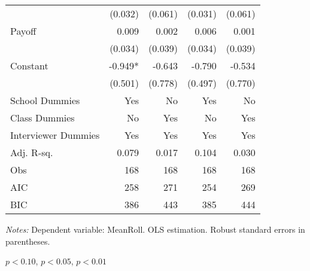 \begin{table}[htbp]
\begin{threeparttable}
\begin{tabular}{l*{4}{D{.}{.}{-1}}}
                    &             (0.032)   &             (0.061)   &             (0.031)   &             (0.061)   \\
Payoff              &               0.009   &               0.002   &               0.006   &               0.001   \\
                    &             (0.034)   &             (0.039)   &             (0.034)   &             (0.039)   \\
Constant            &              -0.949*  &              -0.643   &              -0.790   &              -0.534   \\
                    &             (0.501)   &             (0.778)   &             (0.497)   &             (0.770)   \\
School Dummies      &                 Yes   &                  No   &                 Yes   &                  No   \\
Class Dummies       &                  No   &                 Yes   &                  No   &                 Yes   \\
Interviewer Dummies &                 Yes   &                 Yes   &                 Yes   &                 Yes   \\
\midrule
Adj. R-sq.          &               0.079   &               0.017   &               0.104   &               0.030   \\
Obs                 &                 168   &                 168   &                 168   &                 168   \\
AIC                 &                 258   &                 271   &                 254   &                 269   \\
BIC                 &                 386   &                 443   &                 385   &                 444   \\
\bottomrule
\end{tabular}
\begin{tablenotes}
\footnotesize
\item \textit{Notes:} Dependent variable: MeanRoll. OLS estimation. Robust standard errors in parentheses.
\item \sym{*} \(p<0.10\), \sym{**} \(p<0.05\), \sym{***} \(p<0.01\)
\end{tablenotes}
\end{threeparttable}
\label{tab:cheat_tot}
\end{table}
